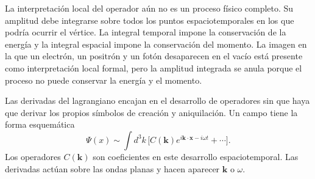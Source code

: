 \begin{classroomqa}
\end{classroomqa}

La interpretación local del operador aún no es un proceso físico completo. Su amplitud debe integrarse sobre todos los puntos espaciotemporales en los que podría ocurrir el vértice. La integral temporal impone la conservación de la energía y la integral espacial impone la conservación del momento. La imagen en la que un electrón, un positrón y un fotón desaparecen en el vacío está presente como interpretación local formal, pero la amplitud integrada se anula porque el proceso no puede conservar la energía y el momento.

\begin{classroomqa}
\end{classroomqa}

\begin{classroomqa}
\end{classroomqa}

Las derivadas del lagrangiano encajan en el desarrollo de operadores sin que haya que derivar los propios símbolos de creación y aniquilación. Un campo tiene la forma esquemática
\begin{equation}
\Psi(x)
\sim
\int d^3k\,
\bigl[
C(\mathbf k)e^{i\mathbf k\cdot\mathbf x-i\omega t}
+\cdots
\bigr].
\end{equation}
Los operadores \(C(\mathbf k)\) son coeficientes en este desarrollo espaciotemporal. Las derivadas actúan sobre las ondas planas y hacen aparecer \(\mathbf k\) o \(\omega\).

